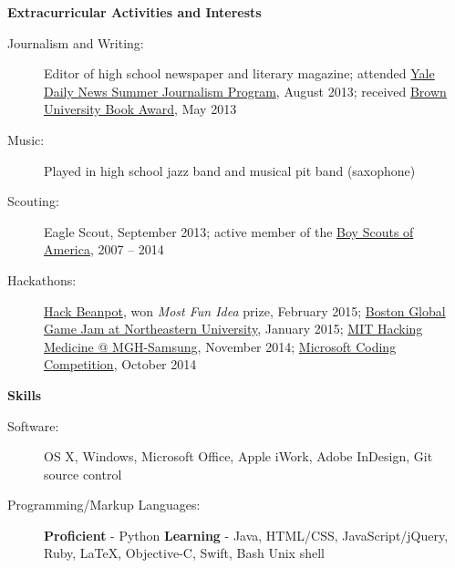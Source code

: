 \documentclass[letterpaper,10pt]{article}
\newcommand{\resheading}[1]{{\large \colorbox{mygrey}{\begin{minipage}{\textwidth}{\textbf{#1 \vphantom{p\^{E}}}}\end{minipage}}}}
\begin{document}
\resheading{Extracurricular Activities and Interests}
	\begin{description}
		\item[Journalism and Writing:] { \footnotesize Editor of high school newspaper and literary magazine; attended \href{http://yaledailynews.com/about-us/sjp/}{Yale Daily News Summer Journalism Program}, August 2013; received \href{http://www.brown.edu/campus-life/support/bookstore/book-award}{Brown University Book Award}, May 2013}
		\item[Music:] { \footnotesize Played in high school jazz band and musical pit band (saxophone)}
		\item[Scouting:] {\footnotesize Eagle Scout, September 2013; active member of the \href{http://www.scouting.org}{Boy Scouts of America}, 2007 -- 2014}
		\item[Hackathons:] {\footnotesize \href{http://hackbeanpot.com}{Hack Beanpot}, won \emph{Most Fun Idea} prize, February 2015; \href{http://globalgamejam.org/2014/jam-sites/boston-ggj-northeastern-university}{Boston Global Game Jam at Northeastern University}, January 2015; \href{http://hackingmedicine.mit.edu/upcoming-events/mgh-samsung/}{MIT Hacking Medicine @ MGH-Samsung}, November 2014; \href{http://www.northeastern.edu/careers/employers/microsoft-coding-competition/}{Microsoft Coding Competition}, October 2014}
		
	\end{description} %
	
\resheading{Skills}
	\begin{description}
		\item[Software:] {\footnotesize OS X, Windows, Microsoft Office, Apple iWork, Adobe InDesign, Git source control}
		\item[Programming/Markup Languages:] {\footnotesize \textbf{Proficient} - Python \enspace \textbf{Learning} - Java, HTML/CSS, JavaScript/jQuery, Ruby, \LaTeX, Objective-C, Swift, Bash Unix shell}
	
	\end{description}
\end{document}
